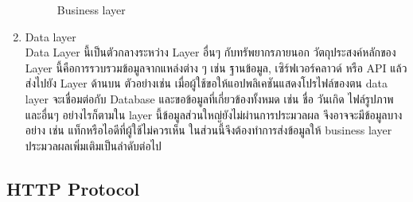 \documentclass[14pt,oneside,openright,a4paper]{cpe-thai-project}
\begin{document}
\begin{enumerate}
      \begin{figure}[!h]\centering
        \setlength{\fboxrule}{0.5mm} %
        \setlength{\fboxsep}{0.4cm}
        \caption{Business layer \cite{BusinessLayer}}\label{fig:business_layer}
      \end{figure}
\newpage
    \item Data layer \\
          Data Layer \cite{MobileAppArchitecture} นี้เป็นตัวกลางระหว่าง Layer อื่นๆ กับทรัพยากรภายนอก
          วัตถุประสงค์หลักของ Layer นี้คือการรวบรวมข้อมูลจากแหล่งต่าง ๆ เช่น ฐานข้อมูล, เซิร์ฟเวอร์คลาวด์ หรือ API แล้วส่งไปยัง Layer ด้านบน 
          ตัวอย่างเช่น เมื่อผู้ใช้ขอให้แอปพลิเคชันแสดงโปรไฟล์ของตน data layer จะเชื่อมต่อกับ Database และขอข้อมูลที่เกี่ยวข้องทั้งหมด เช่น ชื่อ วันเกิด ไฟล์รูปภาพ และอื่นๆ อย่างไรก็ตามใน layer นี้ข้อมูลส่วนใหญ่ยังไม่ผ่านการประมวลผล จึงอาจจะมีข้อมูลบางอย่าง เช่น แท็กหรือไอดีที่ผู้ใช้ไม่ควรเห็น ในส่วนนี้จึงต้องทำการส่งข้อมูลให้ business layer ประมวลผลเพิ่มเติมเป็นลำดับต่อไป
    \end{enumerate}

\subsection {HTTP Protocol} 
\end{document}

